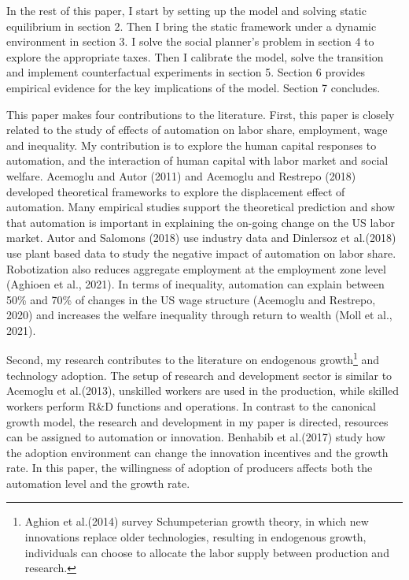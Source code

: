 \documentclass[12pt]{article}
\begin{document}
In the rest of this paper, I start by setting up the model and solving static equilibrium in section 2. Then I bring the static framework under a dynamic environment in section 3. I solve the social planner's problem in section 4 to explore the appropriate taxes. Then I calibrate the model, solve the transition and implement counterfactual experiments in section 5. Section 6 provides empirical evidence for the key implications of the model. Section 7 concludes. 

This paper makes four contributions to the literature. First, this paper is closely related to the study of effects of automation on labor share, employment, wage and inequality. My contribution is to explore the human capital responses to automation, and the interaction of human capital with labor market and social welfare. Acemoglu and Autor (2011)\nocite{AcemogluAutor2011} and Acemoglu and Restrepo (2018)\nocite{AcemogluRestrepo2018} developed theoretical frameworks to explore the displacement effect of automation. Many empirical studies support the theoretical prediction and show that automation is important in explaining the on-going change on the US labor market. Autor and Salomons (2018)\nocite{AutorSalomons2018} use industry data and Dinlersoz et al.(2018)\nocite{Dinlersozetal2018} use plant based data to study the negative impact of automation on labor share. Robotization also reduces aggregate employment at the employment zone level (Aghioen et al., 2021\nocite{Aghioenetal2021}). In terms of inequality, automation can explain between 50\% and 70\% of changes in the US wage structure (Acemoglu and Restrepo, 2020\nocite{AcemogluRestrepo2020}) and increases the welfare inequality through return to wealth (Moll et al., 2021\nocite{Molletal2021}).

Second, my research contributes to the literature on endogenous growth\footnote{Aghion et al.(2014)\nocite{Aghionetal2014} survey Schumpeterian growth theory, in which new innovations replace older technologies, resulting in endogenous growth, individuals can choose to allocate the labor supply between production and research.} and technology adoption. The setup of research and development sector is similar to Acemoglu et al.(2013)\nocite{Acemogluetal2013}, unskilled workers are used in the production, while skilled workers perform R\&D functions and operations. In contrast to the canonical growth model, the research and development in my paper is directed, resources can be assigned to automation or innovation. Benhabib et al.(2017)\nocite{Benhabibetal2017} study how the adoption environment can change the innovation incentives and the growth rate. In this paper, the willingness of adoption of producers affects both the automation level and the growth rate. 
\end{document}
